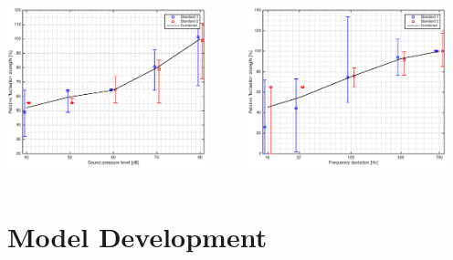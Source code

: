 \documentclass{beamer}
\begin{document}
\begin{frame}
  \begin{columns}
    \begin{column}{0.5\textwidth}
      \includegraphics[width=0.9\textwidth]{FM-SPL_all_standards}
    \end{column}
    \begin{column}{0.5\textwidth}
      \includegraphics[width=0.9\textwidth]{FM-df_all_standards}
    \end{column}
  \end{columns}

\end{frame}

\section{Model Development}
\end{document}
